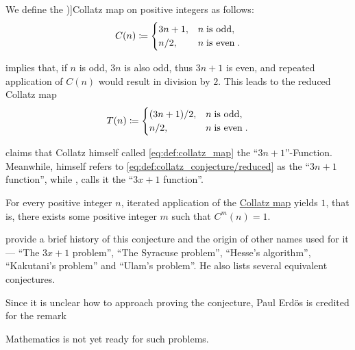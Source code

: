 \begin{definition}\label{def:collatz_map}
  We define the \term[en=Collatz function (\cite[1]{Lagarias2021CollatzOverview})]{Collatz map} on positive integers as follows:
  \begin{equation}\label{eq:def:collatz_map}
    C(n) \coloneqq \begin{cases}
      3n + 1, &n \T{is odd}, \\
      n / 2,  &n \T{is even}.
    \end{cases}
  \end{equation}
\end{definition}
\begin{comments}
  \item {} implies that, if \( n \) is odd, \( 3n \) is also odd, thus \( 3n + 1 \) is even, and repeated application of \( C(n) \) would result in division by \( 2 \). This leads to the reduced Collatz map
  \begin{equation}\label{eq:def:collatz_conjecture/reduced}
    T(n) \coloneqq \begin{cases}
      (3n + 1) / 2, &n \T{is odd}, \\
      n / 2,        &n \T{is even}.
    \end{cases}
  \end{equation}

  \item {} claims that Collatz himself called \eqref{eq:def:collatz_map} the \enquote{\( 3n + 1 \)}-Function. Meanwhile,  himself refers to \eqref{eq:def:collatz_conjecture/reduced} as the \enquote{\( 3n + 1 \) function}, while , calls it the \enquote{\( 3x + 1 \) function}.
\end{comments}

\begin{conjecture}\label{thm:collatz_conjecture}
  For every positive integer \( n \), iterated application of the \hyperref[def:collatz_map]{Collatz map} yields \( 1 \), that is, there exists some positive integer \( m \) such that \( C^m(n) = 1 \).
\end{conjecture}
\begin{comments}
  \item {} provide a brief history of this conjecture and the origin of other names used for it --- \enquote{The \( 3x + 1 \) problem}, \enquote{The Syracuse problem}, \enquote{Hesse's algorithm}, \enquote{Kakutani's problem} and \enquote{Ulam's problem}. He also lists several equivalent conjectures.

  Since it is unclear how to approach proving the conjecture, Paul Erd\"os is credited for the remark
  \begin{displayquote}
    Mathematics is not yet ready for such problems.
  \end{displayquote}
\end{comments}


